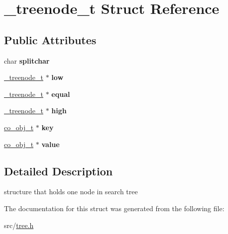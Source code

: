 \hypertarget{struct__treenode__t}{\section{\-\_\-treenode\-\_\-t Struct Reference}
\label{struct__treenode__t}
}
\subsection*{Public Attributes}
\begin{DoxyCompactItemize}
\item 
\hypertarget{struct__treenode__t_a9089b5d471580a0ef77e47f4261bb9d3}{char {\bfseries splitchar}}\label{struct__treenode__t_a9089b5d471580a0ef77e47f4261bb9d3}

\item 
\hypertarget{struct__treenode__t_aa73e5f37998912d04a24f9106c70762e}{\hyperlink{struct__treenode__t}{\-\_\-treenode\-\_\-t} $\ast$ {\bfseries low}}\label{struct__treenode__t_aa73e5f37998912d04a24f9106c70762e}

\item 
\hypertarget{struct__treenode__t_aebfbeddd8670ad12dcd94e1483a2ea8f}{\hyperlink{struct__treenode__t}{\-\_\-treenode\-\_\-t} $\ast$ {\bfseries equal}}\label{struct__treenode__t_aebfbeddd8670ad12dcd94e1483a2ea8f}

\item 
\hypertarget{struct__treenode__t_ab0aa90950153cde8e10454615a94a381}{\hyperlink{struct__treenode__t}{\-\_\-treenode\-\_\-t} $\ast$ {\bfseries high}}\label{struct__treenode__t_ab0aa90950153cde8e10454615a94a381}

\item 
\hypertarget{struct__treenode__t_ade0dc24afec0dc16b8345d353241a88f}{\hyperlink{structco__obj__t}{co\-\_\-obj\-\_\-t} $\ast$ {\bfseries key}}\label{struct__treenode__t_ade0dc24afec0dc16b8345d353241a88f}

\item 
\hypertarget{struct__treenode__t_a28e0f88580b336f9924edf26c364aa9c}{\hyperlink{structco__obj__t}{co\-\_\-obj\-\_\-t} $\ast$ {\bfseries value}}\label{struct__treenode__t_a28e0f88580b336f9924edf26c364aa9c}

\end{DoxyCompactItemize}


\subsection{Detailed Description}
structure that holds one node in search tree 

The documentation for this struct was generated from the following file\-:\begin{DoxyCompactItemize}
\item 
src/\hyperlink{tree_8h}{tree.\-h}\end{DoxyCompactItemize}
